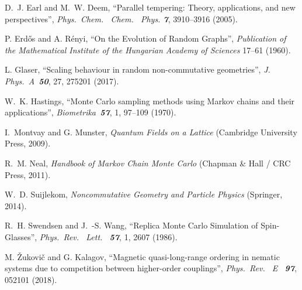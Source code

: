 \documentclass[12pt,a4paper]{article}
\begin{document}
\begin{thebibliography}{99}
D.~J. Earl and M.~W. Deem,
``Parallel tempering: Theory, applications, and new perspectives'',
{\it Phys.\ Chem. \ Chem. \ Phys. \bf 7}, 3910--3916 (2005).

P. Erd\H os and A. R\'enyi,
``On the Evolution of Random Graphs'',
{\it Publication of the Mathematical Institute of the Hungarian Academy of Sciences\/}
17--61 (1960).

L. Glaser,
``Scaling behaviour in random non-commutative geometries'',
{\it J. Phys.\ A\ \bf 50}, 27, 275201 (2017).

W.~K. Hastings,
``Monte  Carlo sampling  methods using  Markov chains  and their applications'',
{\it Biometrika\ \bf 57}, 1, 97--109 (1970).

I.~Montvay and G. Munster,
{\it Quantum Fields on a Lattice\/}
(Cambridge University Press, 2009).

R.~M. Neal,
{\it Handbook of Markov Chain Monte Carlo\/}
(Chapman \& Hall / CRC Press, 2011).

W.~D. Suijlekom,
{\it Noncommutative Geometry and Particle Physics\/}
(Springer, 2014).

R.~H. Swendsen and J.~-S. Wang,
``Replica Monte Carlo Simulation of Spin-Glasses'',
{\it Phys.\ Rev. \ Lett. \ \bf 57}, 1, 2607 (1986).

M. \v Zukovi\v c and G. Kalagov,
``Magnetic quasi-long-range ordering in nematic systems due to competition between higher-order couplings'',
{\it Phys.\ Rev. \ E \ \bf 97}, 052101 (2018).


\end{thebibliography}
\end{document}
